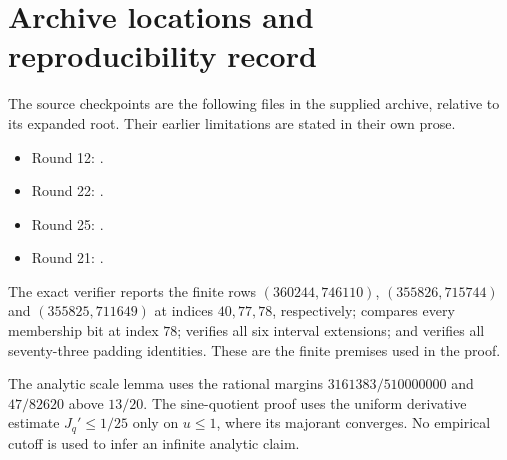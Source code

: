 \documentclass[11pt,a4paper]{article}
\numberwithin{equation}{section}
\theoremstyle{remark}
\begin{document}
\section{Archive locations and reproducibility record}
\label{app:archive}
The source checkpoints are the following files in the supplied
archive, relative to its expanded root. Their earlier
limitations are stated in their own prose.
\begin{itemize}\small\raggedright
\item Round 12: .
\item Round 22: .
\item Round 25: .
\item Round 21: .
\end{itemize}
The exact verifier reports the finite rows
$(360244,746110)$, $(355826,715744)$ and $(355825,711649)$
at indices $40,77,78$, respectively; compares every membership
bit at index $78$; verifies all six interval extensions; and
verifies all seventy-three padding identities. These are the
finite premises used in the proof.

The analytic scale lemma uses the rational margins
$3161383/510000000$ and $47/82620$ above $13/20$.
The sine-quotient proof uses the uniform derivative estimate
$J_q'\le1/25$ only on $u\le1$, where its majorant converges.
No empirical cutoff is used to infer an infinite analytic claim.
\end{document}
